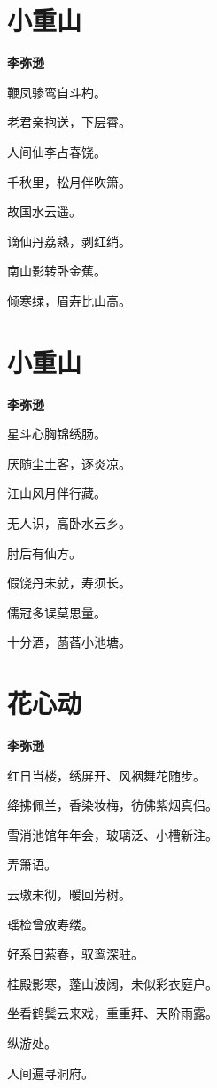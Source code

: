 \documentclass[12pt,a4paper]{ctexbook}
\begin{document}
\section{小重山}
\textbf{李弥逊}\par\vspace{0.5em}
鞭凤骖鸾自斗杓。\par
老君亲抱送，下层霄。\par
人间仙李占春饶。\par
千秋里，松月伴吹箫。\par
故国水云遥。\par
谪仙丹荔熟，剥红绡。\par
南山影转卧金蕉。\par
倾寒绿，眉寿比山高。\par

\section{小重山}
\textbf{李弥逊}\par\vspace{0.5em}
星斗心胸锦绣肠。\par
厌随尘土客，逐炎凉。\par
江山风月伴行藏。\par
无人识，高卧水云乡。\par
肘后有仙方。\par
假饶丹未就，寿须长。\par
儒冠多误莫思量。\par
十分酒，菡萏小池塘。\par

\section{花心动}
\textbf{李弥逊}\par\vspace{0.5em}
红日当楼，绣屏开、风裀舞花随步。\par
绛拂佩兰，香染妆梅，彷佛紫烟真侣。\par
雪消池馆年年会，玻璃泛、小槽新注。\par
弄箫语。\par
云璈未彻，暖回芳树。\par
瑶检曾攽寿缕。\par
好系日萦春，驭鸾深驻。\par
桂殿影寒，蓬山波阔，未似彩衣庭户。\par
坐看鹤鬓云来戏，重重拜、天阶雨露。\par
纵游处。\par
人间遍寻洞府。\par
\end{document}
